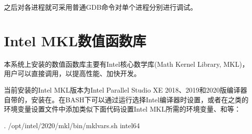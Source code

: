 \documentclass[a4paper,12pt,english]{sphinxmanual}
\begin{document}
\sphinxAtStartPar
之后对各进程就可采用普通GDB命令对单个进程分别进行调试。

\sphinxstepscope


\chapter{Intel MKL数值函数库}
\label{\detokenize{intel-mkl/intel-mkl:intel-mkl}}\label{\detokenize{intel-mkl/intel-mkl::doc}}
\sphinxAtStartPar
本系统上安装的数值函数库主要有Intel核心数学库(Math Kernel Library, MKL)，用户可以直接调用，以提高性能、加快开发。

\sphinxAtStartPar
当前安装的Intel MKL版本为Intel Parallel Studio XE 2018、2019和2020版编译器自带的，安装在。在BASH下可以通过运行选择Intel编译器时设置，或者在之类的环境变量设置文件中添加类似下面代码设置Intel MKL所需的环境变量、和等：

\begin{sphinxVerbatim}[commandchars=\\\{\}]
. /opt/intel/2020/mkl/bin/mklvars.sh intel64
\end{sphinxVerbatim}
\end{document}
